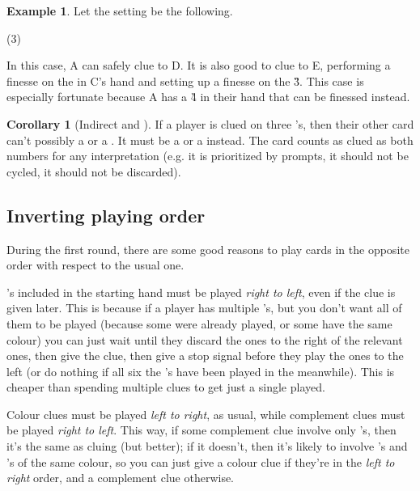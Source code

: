 \documentclass[a4paper]{article}
\theoremstyle{plain}
\theoremstyle{definition}
\newtheorem{corollary}[theorem]{Corollary}
\newtheorem{example}[theorem]{Example}
\begin{document}
\begin{example}
	
	Let the setting be the following.
	
	\begin{tasks}(3)
		\task[+]      
		\task[A]    
		\task[B]    
		\task[C]    
		\task[D]    
		\task[E]    
	\end{tasks}
	
	In this case, A can safely clue  to D. It is also good to clue  to E, performing a finesse on the  in C's hand and setting up a finesse on the \G{3}. This case is especially fortunate because A has a \G{4} in their hand that can be finessed instead.
\end{example}

\begin{corollary}[Indirect  and ]
	\label{indirect25}
	If a player is clued on three 's, then their other card can't possibly a  or a . It must be a  or a  instead. The card counts as clued as both numbers for any interpretation (e.g. it is prioritized by prompts, it should not be cycled, it should not be discarded).
\end{corollary}

\subsection{Inverting playing order}

During the first round, there are some good reasons to play cards in the opposite order with respect to the usual one.

's included in the starting hand must be played \textit{right to left}, even if the clue is given later. This is because if a player has multiple 's, but you don't want all of them to be played (because some were already played, or some have the same colour) you can just wait until they discard the ones to the right of the relevant ones, then give the clue, then give a stop signal before they play the ones to the left (or do nothing if all six the 's have been played in the meanwhile). This is cheaper than spending multiple clues to get just a single  played.

Colour clues must be played \textit{left to right}, as usual, while complement clues must be played \textit{right to left}. This way, if some complement clue involve only 's, then it's the same as cluing  (but better); if it doesn't, then it's likely to involve 's and 's of the same colour, so you can just give a colour clue if they're in the \textit{left to right} order, and a complement clue otherwise.
\end{document}
